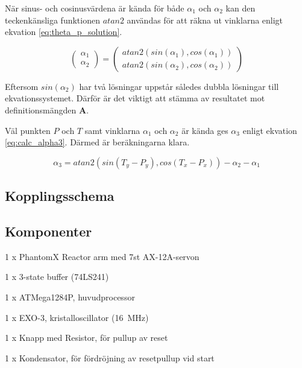 När sinus- och cosinusvärdena är kända för både $\alpha_{1}$ och $\alpha_{2}$ kan den teckenkänsliga funktionen $atan2$ användas för att räkna ut vinklarna enligt ekvation \ref{eq:theta_p_solution}.

\begin{equation}
	\label{eq:theta_p_solution}
	\begin{pmatrix}
		\alpha_{1}\\
		\alpha_{2}
	\end{pmatrix}
	=
	\begin{pmatrix}
		atan2(sin(\alpha_{1}), cos(\alpha_{1}))\\
		atan2(sin(\alpha_{2}), cos(\alpha_{2}))
	\end{pmatrix}
\end{equation}

Eftersom $sin(\alpha_{2})$ har två lösningar uppstår således dubbla lösningar till ekvationssystemet. Därför är det viktigt att stämma av resultatet mot definitionsmängden $\mathbf{A}$.

Väl punkten $P$ och $T$ samt vinklarna $\alpha_{1}$ och $\alpha_{2}$ är kända ges $\alpha_{3}$ enligt ekvation \ref{eq:calc_alpha3}. Därmed är beräkningarna klara.

\begin{equation}
	\label{eq:calc_alpha3}
\alpha_{3} = atan2(sin(T_y - P_y), cos(T_x - P_x)) - \alpha_{2} - \alpha_{1}
\end{equation}

\subsection{Kopplingsschema}

\subsection{Komponenter}

\begin{packed_itemize}
\item 1 x PhantomX Reactor arm med 7st AX-12A-servon
\item 1 x 3-state buffer (74LS241)
\item 1 x ATMega1284P, huvudprocessor
\item 1 x EXO-3, kristalloscillator (16~MHz)
\item 1 x Knapp med Resistor, för pullup av reset
\item 1 x Kondensator, för fördröjning av resetpullup vid start
\end{packed_itemize}

